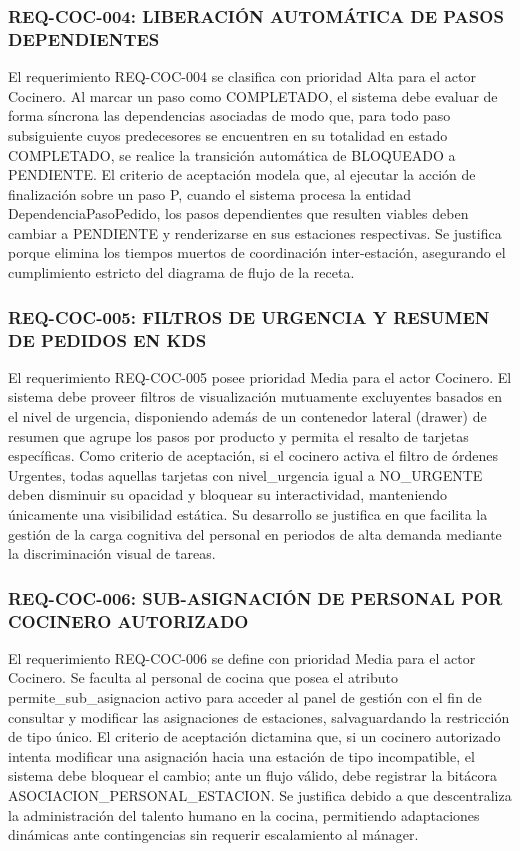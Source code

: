 \subsubsection{REQ-COC-004: LIBERACIÓN AUTOMÁTICA DE PASOS DEPENDIENTES}
El requerimiento REQ-COC-004 se clasifica con prioridad Alta para el actor Cocinero. Al marcar un paso como COMPLETADO, el sistema debe evaluar de forma síncrona las dependencias asociadas de modo que, para todo paso subsiguiente cuyos predecesores se encuentren en su totalidad en estado COMPLETADO, se realice la transición automática de BLOQUEADO a PENDIENTE. El criterio de aceptación modela que, al ejecutar la acción de finalización sobre un paso P, cuando el sistema procesa la entidad DependenciaPasoPedido, los pasos dependientes que resulten viables deben cambiar a PENDIENTE y renderizarse en sus estaciones respectivas. Se justifica porque elimina los tiempos muertos de coordinación inter-estación, asegurando el cumplimiento estricto del diagrama de flujo de la receta.

\subsubsection{REQ-COC-005: FILTROS DE URGENCIA Y RESUMEN DE PEDIDOS EN KDS}
El requerimiento REQ-COC-005 posee prioridad Media para el actor Cocinero. El sistema debe proveer filtros de visualización mutuamente excluyentes basados en el nivel de urgencia, disponiendo además de un contenedor lateral (drawer) de resumen que agrupe los pasos por producto y permita el resalto de tarjetas específicas. Como criterio de aceptación, si el cocinero activa el filtro de órdenes Urgentes, todas aquellas tarjetas con nivel\_urgencia igual a NO\_URGENTE deben disminuir su opacidad y bloquear su interactividad, manteniendo únicamente una visibilidad estática. Su desarrollo se justifica en que facilita la gestión de la carga cognitiva del personal en periodos de alta demanda mediante la discriminación visual de tareas.

\subsubsection{REQ-COC-006: SUB-ASIGNACIÓN DE PERSONAL POR COCINERO AUTORIZADO}
El requerimiento REQ-COC-006 se define con prioridad Media para el actor Cocinero. Se faculta al personal de cocina que posea el atributo permite\_sub\_asignacion activo para acceder al panel de gestión con el fin de consultar y modificar las asignaciones de estaciones, salvaguardando la restricción de tipo único. El criterio de aceptación dictamina que, si un cocinero autorizado intenta modificar una asignación hacia una estación de tipo incompatible, el sistema debe bloquear el cambio; ante un flujo válido, debe registrar la bitácora ASOCIACION\_PERSONAL\_ESTACION. Se justifica debido a que descentraliza la administración del talento humano en la cocina, permitiendo adaptaciones dinámicas ante contingencias sin requerir escalamiento al mánager.


